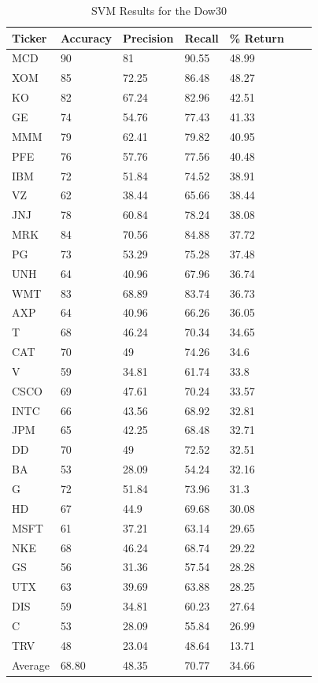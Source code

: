 \documentclass{article}
\begin{document}
\begin{table}[h]
  \begin{tabular}{@{}lllllll@{}}
    \toprule
    Ticker & Accuracy & Precision & Recall & \% Return & \\ \midrule
    MCD & 90 & 81 & 90.55 & 48.99 & \\
    XOM & 85 & 72.25 & 86.48 & 48.27 & \\
    KO & 82 & 67.24 & 82.96 & 42.51 & \\
    GE & 74 & 54.76 & 77.43 & 41.33 & \\
    MMM & 79 & 62.41 & 79.82 & 40.95 & \\
    PFE & 76 & 57.76 & 77.56 & 40.48 & \\
    IBM & 72 & 51.84 & 74.52 & 38.91 & \\
    VZ & 62 & 38.44 & 65.66 & 38.44 & \\
    JNJ & 78 & 60.84 & 78.24 & 38.08 & \\
    MRK & 84 & 70.56 & 84.88 & 37.72 & \\
    PG & 73 & 53.29 & 75.28 & 37.48 & \\
    UNH & 64 & 40.96 & 67.96 & 36.74 & \\
    WMT & 83 & 68.89 & 83.74 & 36.73 & \\
    AXP & 64 & 40.96 & 66.26 & 36.05 & \\
    T & 68 & 46.24 & 70.34 & 34.65 & \\
    CAT & 70 & 49 & 74.26 & 34.6 & \\
    V & 59 & 34.81 & 61.74 & 33.8 & \\
    CSCO & 69 & 47.61 & 70.24 & 33.57 & \\
    INTC & 66 & 43.56 & 68.92 & 32.81 & \\
    JPM & 65 & 42.25 & 68.48 & 32.71 & \\
    DD & 70 & 49 & 72.52 & 32.51 & \\
    BA & 53 & 28.09 & 54.24 & 32.16 & \\
    G & 72 & 51.84 & 73.96 & 31.3 & \\
    HD & 67 & 44.9 & 69.68 & 30.08 & \\
    MSFT & 61 & 37.21 & 63.14 & 29.65 & \\
    NKE & 68 & 46.24 & 68.74 & 29.22 & \\
    GS & 56 & 31.36 & 57.54 & 28.28 & \\
    UTX & 63 & 39.69 & 63.88 & 28.25 & \\
    DIS & 59 & 34.81 & 60.23 & 27.64 & \\
    C & 53 & 28.09 & 55.84 & 26.99 & \\
    TRV & 48 & 23.04 & 48.64 & 13.71 & \\ \bottomrule
    Average & 68.80 & 48.35 & 70.77 & 34.66 & \\
  \end{tabular}
  \caption{SVM Results for the Dow30}
  \label{my-label}
\end{table}
\end{document}
